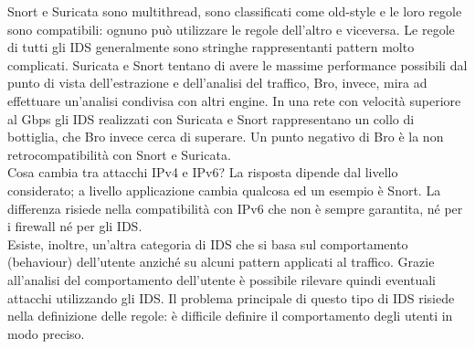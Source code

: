 Snort e Suricata sono multithread, sono classificati come old-style e le loro regole sono compatibili: ognuno può utilizzare le regole dell'altro e viceversa. Le regole di tutti gli IDS generalmente sono stringhe rappresentanti pattern molto complicati. Suricata e Snort tentano di avere le massime performance possibili dal punto di vista dell'estrazione e dell'analisi del traffico, Bro, invece, mira ad effettuare un'analisi condivisa con altri engine. In una rete con velocità superiore al Gbps gli IDS realizzati con Suricata e Snort rappresentano un collo di bottiglia, che Bro invece cerca di superare. Un punto negativo di Bro è la non retrocompatibilità con Snort e Suricata.\\
Cosa cambia tra attacchi IPv4 e IPv6? La risposta dipende dal livello considerato; a livello applicazione cambia qualcosa ed un esempio è Snort. La differenza risiede nella compatibilità con IPv6 che non è sempre garantita, né per i firewall né per gli IDS.\\
Esiste, inoltre, un'altra categoria di IDS che si basa sul comportamento (behaviour) dell'utente anziché su alcuni pattern applicati al traffico. Grazie all'analisi del comportamento dell'utente è possibile rilevare quindi eventuali attacchi utilizzando gli IDS. Il problema principale di questo tipo di IDS risiede nella definizione delle regole: è difficile definire il comportamento degli utenti in modo preciso.